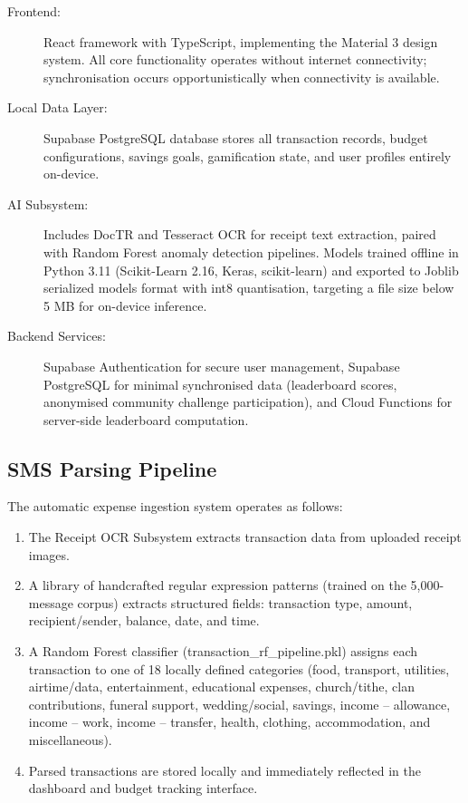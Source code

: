 \documentclass[12pt]{report}
\begin{document}
\begin{description}
    \item[Frontend:] React framework with TypeScript, implementing the Material 3 design system. All core functionality operates without internet connectivity; synchronisation occurs opportunistically when connectivity is available.
    \item[Local Data Layer:] Supabase PostgreSQL database stores all transaction records, budget configurations, savings goals, gamification state, and user profiles entirely on-device.
    \item[AI Subsystem:] Includes DocTR and Tesseract OCR for receipt text extraction, paired with Random Forest anomaly detection pipelines. Models trained offline in Python 3.11 (Scikit-Learn 2.16, Keras, scikit-learn) and exported to Joblib serialized models format with int8 quantisation, targeting a file size below 5 MB for on-device inference.
    \item[Backend Services:] Supabase Authentication for secure user management, Supabase PostgreSQL for minimal synchronised data (leaderboard scores, anonymised community challenge participation), and Cloud Functions for server-side leaderboard computation.
\end{description}

\subsection{SMS Parsing Pipeline}

The automatic expense ingestion system operates as follows:

\begin{enumerate}
    \item The Receipt OCR Subsystem extracts transaction data from uploaded receipt images.
    \item A library of handcrafted regular expression patterns (trained on the 5,000-message corpus) extracts structured fields: transaction type, amount, recipient/sender, balance, date, and time.
    \item A Random Forest classifier (transaction\_rf\_pipeline.pkl) assigns each transaction to one of 18 locally defined categories (food, transport, utilities, airtime/data, entertainment, educational expenses, church/tithe, clan contributions, funeral support, wedding/social, savings, income -- allowance, income -- work, income -- transfer, health, clothing, accommodation, and miscellaneous).
    \item Parsed transactions are stored locally and immediately reflected in the dashboard and budget tracking interface.
\end{enumerate}
\end{document}
